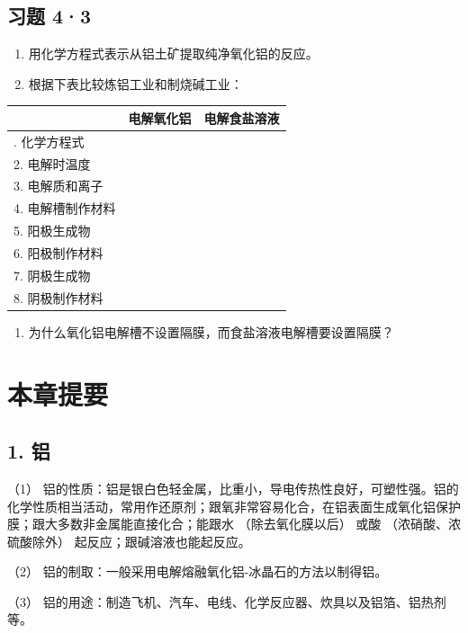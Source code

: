 \subsection{习题 4·3}

\begin{enumerate}
\item
  用化学方程式表示从铝土矿提取纯净氧化铝的反应。
\item
  根据下表比较炼铝工业和制烧碱工业：
\end{enumerate}

{\def\LTcaptype{none} %
\begin{longtable}[]{@{}lll@{}}
\toprule\noalign{}
& 电解氧化铝 & 电解食盐溶液 \\
\midrule\noalign{}
\endhead
\bottomrule\noalign{}
\endlastfoot
1. 化学方程式 & & \\
2. 电解时温度 & & \\
3. 电解质和离子 & & \\
4. 电解槽制作材料 & & \\
5. 阳极生成物 & & \\
6. 阳极制作材料 & & \\
7. 阴极生成物 & & \\
8. 阴极制作材料 & & \\
\end{longtable}
}

\begin{enumerate}[start=3]
\item
  为什么氧化铝电解槽不设置隔膜，而食盐溶液电解槽要设置隔膜？
\end{enumerate}

\section{本章提要}

\subsection{1. 铝}

（1）
铝的性质：铝是银白色轻金属，比重小，导电传热性良好，可塑性强。铝的化学性质相当活动，常用作还原剂；跟氧非常容易化合，在铝表面生成氧化铝保护膜；跟大多数非金属能直接化合；能跟水
（除去氧化膜以后） 或酸 （浓硝酸、浓硫酸除外）
起反应；跟碱溶液也能起反应。

（2） 铝的制取：一般采用电解熔融氧化铝-冰晶石的方法以制得铝。

（3）
铝的用途：制造飞机、汽车、电线、化学反应器、炊具以及铝箔、铝热剂等。


